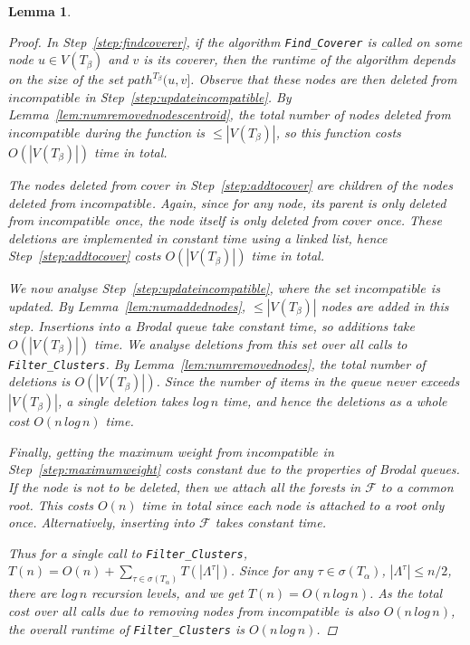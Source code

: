 \documentclass[12pt,a4paper]{article}
\newcommand{\leafset}{\Lambda}
\newcommand{\TA}{T_\alpha}
\newcommand{\TB}{T_\beta}
\newtheorem{filterclustersruntime}[incompatibility]{Lemma}
\begin{document}
\begin{filterclustersruntime}
\begin{proof}
            In Step~\ref{step:findcoverer}, if the algorithm \texttt{Find\_Coverer} is called on some node $u \in V(\TB)$ and $v$ is its coverer, then the runtime of the algorithm depends on the size of the set $path^{\TB}(u, v]$. Observe that these nodes are then deleted from $incompatible$ in Step~\ref{step:updateincompatible}. By Lemma~\ref{lem:numremovednodescentroid}, the total number of nodes deleted from $incompatible$ during the function is $\leq |V(\TB)|$, so this function costs $O(|V(\TB)|)$ time in total.

            The nodes deleted from $cover$ in Step~\ref{step:addtocover} are children of the nodes deleted from $incompatible$. Again, since for any node, its parent is only deleted from $incompatible$ once, the node itself is only deleted from $cover$ once. These deletions are implemented in constant time using a linked list, hence Step~\ref{step:addtocover} costs $O(|V(\TB)|)$ time in total.

            We now analyse Step~\ref{step:updateincompatible}, where the set $incompatible$ is updated. By Lemma~\ref{lem:numaddednodes}, $\leq |V(\TB)|$ nodes are added in this step. Insertions into a Brodal queue take constant time, so additions take $O(|V(\TB)|)$ time. We analyse deletions from this set over \textit{all} calls to \texttt{Filter\_Clusters}. By Lemma~\ref{lem:numremovednodes}, the total number of deletions is $O(|V(\TB)|)$. Since the number of items in the queue never exceeds $|V(\TB)|$, a single deletion takes $log\,n$ time, and hence the deletions as a whole cost $O(n\,log\,n)$ time.

            Finally, getting the maximum weight from $incompatible$ in Step~\ref{step:maximumweight} costs constant due to the properties of Brodal queues. If the node is not to be deleted, then we attach all the forests in $\mathcal{F}$ to a common root. This costs $O(n)$ time in total since each node is attached to a root only once. Alternatively, inserting into $\mathcal{F}$ takes constant time.

            Thus for a single call to \texttt{Filter\_Clusters}, $T(n) = O(n) + \sum_{\tau \in \sigma(\TA)} T(|\leafset^{\tau}|)$. Since for any $\tau \in \sigma(\TA)$, $|\leafset^{\tau}| \leq n/2$, there are $log\,n$ recursion levels, and we get $T(n) = O(n\,log\,n)$. As the total cost over all calls due to removing nodes from $incompatible$ is also $O(n\,log\,n)$, the overall runtime of \texttt{Filter\_Clusters} is $O(n\,log\,n)$.
        \end{proof}
    \end{filterclustersruntime}
\end{document}
